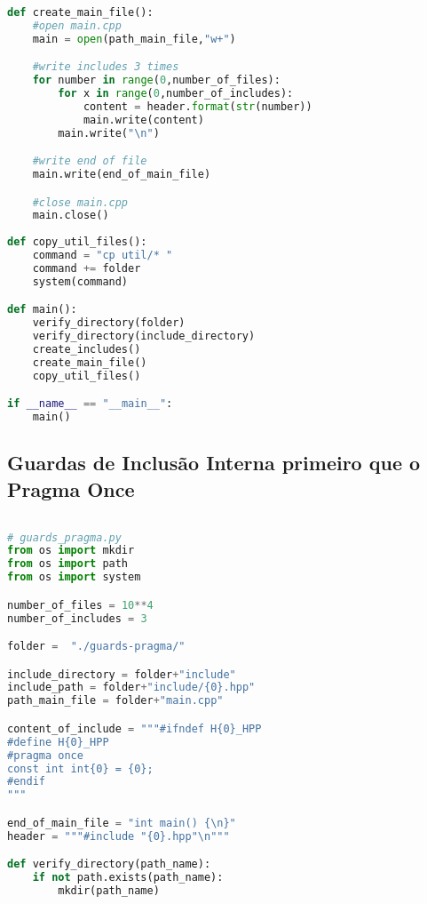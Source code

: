 \begin{apendicesenv}
\begin{lstlisting}[language=Python,caption={
              Script Guardas de Inclusão Interna},
                     label=script_intenal_include]
def create_main_file():
    #open main.cpp
    main = open(path_main_file,"w+")

    #write includes 3 times
    for number in range(0,number_of_files):
        for x in range(0,number_of_includes):
            content = header.format(str(number))
            main.write(content)
        main.write("\n")

    #write end of file
    main.write(end_of_main_file)

    #close main.cpp
    main.close()
                                                                                  
def copy_util_files():                                                           
    command = "cp util/* "                                                       
    command += folder                                                            
    system(command)      

def main():
    verify_directory(folder)
    verify_directory(include_directory)
    create_includes()
    create_main_file()
    copy_util_files()

if __name__ == "__main__":
    main()
\end{lstlisting}

\subsection{Guardas de Inclusão Interna primeiro que o Pragma Once}
\begin{lstlisting}[language=Python, caption={
Script Guardas de Inclusão Interna primeiro que \textit{Pragma Once}},
                   label=script_guards_pragma_include]
                   
# guards_pragma.py
from os import mkdir
from os import path
from os import system

number_of_files = 10**4
number_of_includes = 3

folder =  "./guards-pragma/"

include_directory = folder+"include"
include_path = folder+"include/{0}.hpp"
path_main_file = folder+"main.cpp"

content_of_include = """#ifndef H{0}_HPP
#define H{0}_HPP
#pragma once
const int int{0} = {0};
#endif
"""

end_of_main_file = "int main() {\n}"
header = """#include "{0}.hpp"\n"""

def verify_directory(path_name):
    if not path.exists(path_name):
        mkdir(path_name)


\end{lstlisting}
\end{apendicesenv}
